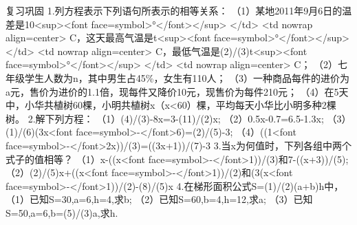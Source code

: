 \beginexercise
复习巩固\newline
1.列方程表示下列语句所表示的相等关系：\newline
（1）某地2011年9月6日的温差是10<sup><font face=symbol>°</font></sup>
</td>
<td nowrap align=center>
  C，这天最高气温是t<sup><font face=symbol>°</font></sup>
</td>
<td nowrap align=center>
  C，最低气温是(2)/(3)t<sup><font face=symbol>°</font></sup>
</td>
<td nowrap align=center>
  C；\newline
（2）七年级学生人数为n，其中男生占45\%，女生有110人；\newline
（3）一种商品每件的进价为a元，售价为进价的1.1倍，现每件又降价10元，现售价为每件210元；\newline
（4）在5天中，小华共植树60棵，小明共植树x（x<60）棵，平均每天小华比小明多种2棵树。\newline
2.解下列方程：\newline
（1）(4)/(3)-8x=3-(11)/(2)x;\newline
（2）0.5x-0.7=6.5-1.3x;\newline
（3）(1)/(6)(3x<font face=symbol>-</font>6)=(2)/(5)-3;\newline
（4）((1<font face=symbol>-</font>2x))/(3)=((3x+1))/(7)-3\newline
3.当x为何值时，下列各组中两个式子的值相等？\newline
（1）x-((x<font face=symbol>-</font>1))/(3)和7-((x+3))/(5);\newline
（2）(2)/(5)x+((x<font face=symbol>-</font>1))/(2)和(3(x<font face=symbol>-</font>1))/(2)-(8)/(5)x\newline
4.在梯形面积公式S=(1)/(2)(a+b)h中，\newline
（1）已知S=30,a=6,h=4,求b;\newline
（2）已知S=60,b=4,h=12,求a;\newline
（3）已知S=50,a=6,b=(5)/(3)a,求h.\newline
\endexercise

